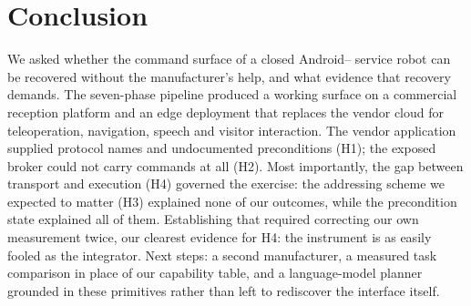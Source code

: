 
\section{Conclusion}

We asked whether the command surface of a closed Android--\ros{} service robot can be recovered
without the manufacturer's help, and what evidence that recovery demands. The seven-phase
pipeline produced a working surface on a commercial reception platform and an edge deployment
that replaces the vendor cloud for teleoperation, navigation, speech and visitor interaction. The
vendor application supplied protocol names and undocumented preconditions (H1); the exposed
broker could not carry commands at all (H2). Most importantly, the gap between transport and
execution (H4) governed the exercise: the addressing scheme we expected to matter (H3) explained
none of our outcomes, while the precondition state explained all of them. Establishing that
required correcting our own measurement twice, our clearest evidence for H4: the instrument is
as easily fooled as the integrator. Next steps: a second manufacturer, a measured task comparison
in place of our capability table, and a language-model planner grounded in these primitives
rather than left to rediscover the interface itself.


%
